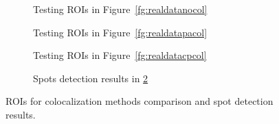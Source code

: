 \documentclass[10pt,twocolumn,twoside]{IEEEtran}
\begin{document}
\begin{figure}[h!]
    \centering
    \begin{subfigure}[b]{0.23\textwidth}
    \centering
        \caption{Testing ROIs in Figure~\ref{fg:realdatanocol}}
        \label{fg:compare1}
    \end{subfigure}
    \begin{subfigure}[b]{0.23\textwidth}
    \centering
        \caption{Testing ROIs in Figure~\ref{fg:realdatapacol}}
        \label{fg:compare2}
    \end{subfigure}
    \begin{subfigure}[b]{0.23\textwidth}
    \centering
        \caption{Testing ROIs in Figure~\ref{fg:realdatacpcol}}
        \label{fg:compare3}
    \end{subfigure}
        \begin{subfigure}[b]{0.23\textwidth}
    \centering
        \caption{Spots detection results in \ref{fg:compare2}}
        \label{fg:spots}
    \end{subfigure}
    \caption{ROIs for colocalization methods comparison and spot detection results.}\label{fg:compareregion}
\end{figure}
\end{document}
